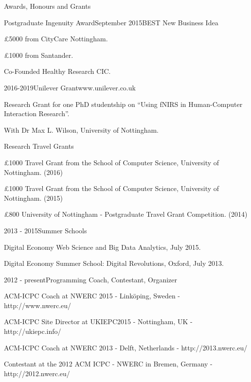 \documentclass{resume} %
\begin{document}
\begin{rSection}{Awards, Honours and Grants}
    \begin{rSubsection}{Postgraduate Ingenuity Award}{September 2015}{BEST New Business Idea}{}
        \item \pounds 5000 from CityCare Nottingham.
        \item \pounds 1000 from Santander.
        \item Co-Founded Healthy Research CIC.
    \end{rSubsection}
    \begin{rSubsection}{}{2016-2019}{Unilever Grant}{www.unilever.co.uk}
        \item Research Grant for one PhD studentship on ``Using fNIRS in Human-Computer Interaction Research''.
        \item With Dr Max L. Wilson, University of Nottingham.
    \end{rSubsection}
    \begin{rSubsection}{}{}{Research Travel Grants}{}
        \item \pounds 1000 Travel Grant from the School of Computer Science, University of Nottingham. (2016)
        \item \pounds 1000 Travel Grant from the School of Computer Science, University of Nottingham. (2015)
        \item \pounds 800 University of Nottingham - Postgraduate Travel Grant Competition. (2014)
    \end{rSubsection}
    \begin{rSubsection}{}{2013 - 2015}{Summer Schools}{}
        \item Digital Economy Web Science and Big Data Analytics, July 2015.
        \item Digital Economy Summer School: Digital Revolutions, Oxford, July 2013.
    \end{rSubsection}
    \begin{rSubsection}{}{2012 - present}{Programming Coach, Contestant, Organizer}{}
        \item  ACM-ICPC Coach at NWERC 2015 - Linköping, Sweden - {http://www.nwerc.eu/}
        \item  ACM-ICPC Site Director at UKIEPC2015 - Nottingham, UK - {http://ukiepc.info/}
        \item  ACM-ICPC Coach at NWERC 2013 - Delft, Netherlands  - {http://2013.nwerc.eu/}
        \item Contestant at the 2012 ACM ICPC - NWERC in Bremen, Germany - {http://2012.nwerc.eu/}
    \end{rSubsection}

\end{rSection}
\end{document}
